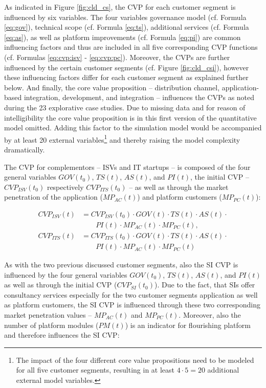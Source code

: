 As indicated in Figure \ref{fig:cld_cs}, the \ac{CVP} for each customer segment is influenced by six variables. The four variables governance model (cf. Formula \ref{eq:gov}), technical scope (cf. Formula \ref{eq:ts}), additional services (cf. Formula \ref{eq:as}), as well as platform improvements (cf. Formula \ref{eq:pi}) are common influencing factors and thus are included in all five corresponding \ac{CVP} functions (cf. Formulas \ref{eq:cvp:isv} - \ref{eq:cvp:pc}). Moreover, the \acp{CVP} are further influenced by the certain customer segments (cf. Figure \ref{fig:cld_csi}), however these influencing factors differ for each customer segment as explained further below. And finally, the core value proposition -- distribution channel, application-based integration, development, and integration -- influences the \acp{CVP} as noted during the 23 explorative case studies. Due to missing data and for reason of intelligibility the core value proposition is in this first version of the quantitative model omitted. Adding this factor to the simulation model would be accompanied by at least 20 external variables\footnote{The impact of the four different core value propositions need to be modeled for all five customer segments, resulting in at least $4 \cdot 5 = 20$ additional external model variables.} and thereby raising the model complexity dramatically.

The \ac{CVP} for complementors -- \acp{ISV} and \ac{IT} startups -- is composed of the four general variables $GOV(t_0)$, $TS(t)$, $AS(t)$, and $PI(t)$, the initial \ac{CVP} -- $CVP_{ISV}(t_0)$ respectively $ CVP_{ITS}(t_0)$ -- as well as through the market penetration of the application ($MP_{AC}(t)$) and platform customers ($MP_{PC}(t)$):

\begin{align}
		CVP_{ISV}(t) &= CVP_{ISV}(t_0) \cdot GOV(t) \cdot TS(t) \cdot AS(t) \cdot \nonumber \\ &\qquad PI(t) \cdot MP_{AC}(t) \cdot MP_{PC}(t),\label{eq:cvp:isv}\\
		CVP_{ITS}(t) &= CVP_{ITS}(t_0) \cdot GOV(t) \cdot TS(t) \cdot AS(t) \cdot \nonumber \\ &\qquad PI(t) \cdot MP_{AC}(t) \cdot MP_{PC}(t)\label{eq:cvp:its}
\end{align}

As with the two previous discussed customer segments, also the \ac{SI} \ac{CVP} is influenced by the four general variables $GOV(t_0)$, $TS(t)$, $AS(t)$, and $PI(t)$ as well as through the initial \ac{CVP} ($CVP_{SI}(t_0)$). Due to the fact, that \acp{SI} offer consultancy services especially for the two customer segments application as well as platform customers, the \ac{SI} \ac{CVP} is influenced through these two corresponding market penetration values -- $MP_{AC}(t)$ and $MP_{PC}(t)$. Moreover, also the number of platform modules ($PM(t)$) is an indicator for flourishing platform and therefore influences the \ac{SI} \ac{CVP}:

